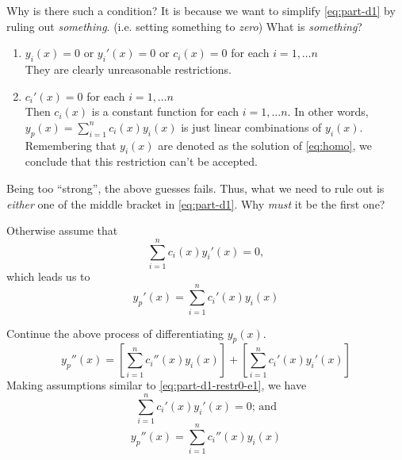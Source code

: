 \documentclass[a4paper,12pt]{article}
\begin{document}
Why is there such a condition? It is because we want to simplify
\eqref{eq:part-d1} by ruling out \emph{something}. (i.e. setting
something to \emph{zero}) What is \emph{something}?
\begin{enumerate}
  \item $y_i(x)=0 \text{ or } y_i'(x)=0 \text{ or } c_i(x)=0$ for each
    $i=1,\dots n$\\
    They are clearly unreasonable restrictions.
  \item $c_i'(x)=0$ for each $i=1,\dots n$\\
    Then $c_i(x)$ is a constant function for each $i=1,\dots n$. In
    other words, $y_p(x)=\sum_{i=1}^{n} c_i(x) y_i(x)$ is just linear
    combinations of $y_i(x)$. Remembering that $y_i(x)$ are denoted as
    the solution of \eqref{eq:homo}, we conclude that this restriction
    can't be accepted.
\end{enumerate}

Being too ``strong'', the above guesses fails. Thus, what we need to
rule out is \emph{either} one of the middle bracket in
\eqref{eq:part-d1}. Why \emph{must} it be the first one?

Otherwise assume that 
\begin{equation}
  \sum_{i=1}^{n} c_i(x) y_i'(x)=0,
  \label{eq:part-d1-restr0-e1}
\end{equation}
which leads us to
\begin{equation}
  y_p'(x)=\sum_{i=1}^{n} c_i'(x) y_i(x)
  \label{eq:part-d1-restr0-d1a}
\end{equation}

Continue the above process of differentiating $y_p(x)$.
\begin{equation}
  y_p''(x)=\left[ \sum_{i=1}^{n} c_i''(x) y_i(x) \right]+\left[
  \sum_{i=1}^{n} c_i'(x) y_i'(x) \right]
  \label{eq:part-d1-restr0-d2}
\end{equation}
Making assumptions similar to \eqref{eq:part-d1-restr0-e1}, we have
\begin{equation}
  \sum_{i=1}^{n} c_i'(x) y_i'(x)=0\text{; and}
  \label{eq:part-d1-restr0-e2}
\end{equation}
\begin{equation}
  y_p''(x)=\sum_{i=1}^{n} c_i''(x) y_i(x)
  \label{eq:part-d1-restr0-d2a}
\end{equation}
\end{document}
